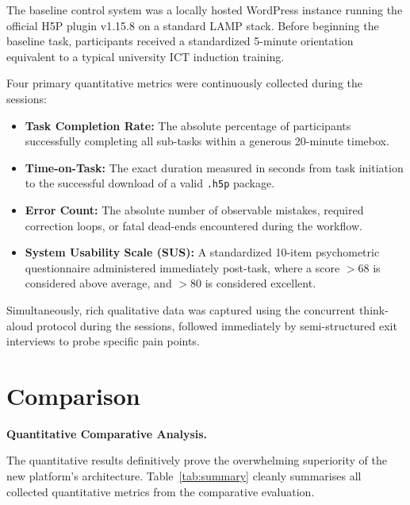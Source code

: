 The baseline control system was a locally hosted WordPress instance running the official H5P plugin v1.15.8 on a standard LAMP stack. Before beginning the baseline task, participants received a standardized 5-minute orientation equivalent to a typical university ICT induction training.

Four primary quantitative metrics were continuously collected during the sessions: 
\begin{itemize}
    \item \textbf{Task Completion Rate:} The absolute percentage of participants successfully completing all sub-tasks within a generous 20-minute timebox.
    \item \textbf{Time-on-Task:} The exact duration measured in seconds from task initiation to the successful download of a valid \texttt{.h5p} package.
    \item \textbf{Error Count:} The absolute number of observable mistakes, required correction loops, or fatal dead-ends encountered during the workflow.
    \item \textbf{System Usability Scale (SUS):} A standardized 10-item psychometric questionnaire administered immediately post-task, where a score $>68$ is considered above average, and $>80$ is considered excellent.
\end{itemize}

Simultaneously, rich qualitative data was captured using the concurrent think-aloud protocol during the sessions, followed immediately by semi-structured exit interviews to probe specific pain points.

\section{Comparison}

\textbf{Quantitative Comparative Analysis.}

The quantitative results definitively prove the overwhelming superiority of the new platform's architecture. Table~\ref{tab:summary} cleanly summarises all collected quantitative metrics from the comparative evaluation.

